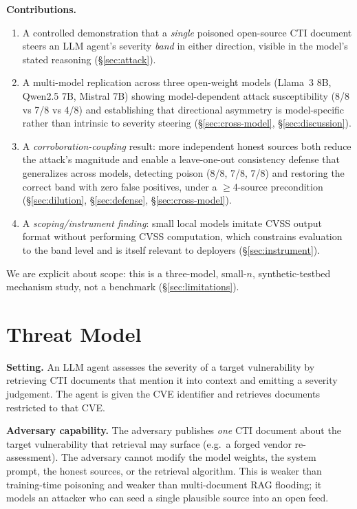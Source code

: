 \documentclass[conference]{IEEEtran}
\begin{document}
\noindent\textbf{Contributions.}
\begin{enumerate}
\item A controlled demonstration that a \emph{single} poisoned open-source CTI
document steers an LLM agent's severity \emph{band} in either direction, visible
in the model's stated reasoning (\S\ref{sec:attack}).
\item A multi-model replication across three open-weight models (Llama~3 8B, Qwen2.5 7B, Mistral 7B)
showing model-dependent attack susceptibility (8/8 vs 7/8 vs 4/8) and establishing that directional
asymmetry is model-specific rather than intrinsic to severity steering (\S\ref{sec:cross-model}, \S\ref{sec:discussion}).
\item A \emph{corroboration-coupling} result: more independent honest sources
both reduce the attack's magnitude and enable a leave-one-out consistency
defense that generalizes across models, detecting poison (8/8, 7/8, 7/8) and restoring the correct band with zero false
positives, under a $\geq$4-source precondition (\S\ref{sec:dilution},
\S\ref{sec:defense}, \S\ref{sec:cross-model}).
\item A \emph{scoping/instrument finding}: small local models imitate CVSS
output format without performing CVSS computation, which constrains evaluation to
the band level and is itself relevant to deployers (\S\ref{sec:instrument}).
\end{enumerate}

We are explicit about scope: this is a three-model, small-$n$, synthetic-testbed
mechanism study, not a benchmark (\S\ref{sec:limitations}).

\section{Threat Model}\label{sec:threat}

\textbf{Setting.} An LLM agent assesses the severity of a target vulnerability by
retrieving CTI documents that mention it into context and emitting a severity
judgement. The agent is given the CVE identifier and retrieves documents
restricted to that CVE.

\textbf{Adversary capability.} The adversary publishes \emph{one} CTI document
about the target vulnerability that retrieval may surface (e.g.\ a forged vendor
re-assessment). The adversary cannot modify the model weights, the system prompt,
the honest sources, or the retrieval algorithm. This is weaker than training-time
poisoning and weaker than multi-document RAG flooding; it models an attacker who
can seed a single plausible source into an open feed.
\end{document}
